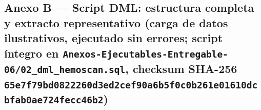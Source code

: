 \documentclass[11pt,a4paper]{article}
\begin{document}
\subsection{\texorpdfstring{Anexo B --- Script DML: estructura completa y extracto representativo (carga de datos ilustrativos, ejecutado sin errores; script íntegro en \texttt{Anexos-Ejecutables-Entregable-06/02\_dml\_hemoscan.sql}, checksum SHA-256 \texttt{65e7f79bd0822260d3ed2cef90a6b5f0c0b261e01610dcbfab0ae724fecc46b2})}{Anexo B --- Script DML: estructura completa y extracto representativo (carga de datos ilustrativos, ejecutado sin errores; script íntegro en Anexos-Ejecutables-Entregable-06/02\_dml\_hemoscan.sql, checksum SHA-256 65e7f79bd0822260d3ed2cef90a6b5f0c0b261e01610dcbfab0ae724fecc46b2)}}\label{anexo-b-script-dml-estructura-completa-y-extracto-representativo-carga-de-datos-ilustrativos-ejecutado-sin-errores-script-uxedntegro-en-anexos-ejecutables-entregable-0602_dml_hemoscan.sql-checksum-sha-256-65e7f79bd0822260d3ed2cef90a6b5f0c0b261e01610dcbfab0ae724fecc46b2}
\end{document}
